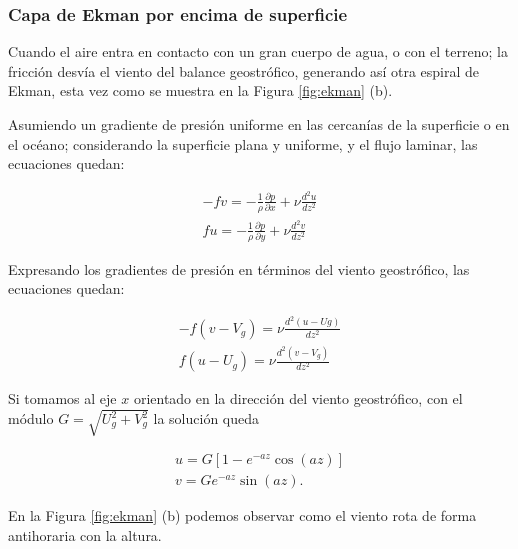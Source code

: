 \documentclass[openany]{book}
\begin{document}
\subsubsection{Capa de Ekman por encima de superficie}
Cuando el aire entra en contacto con un gran cuerpo de agua, o con el
terreno; la fricción desvía el viento del balance geostrófico,
generando así otra espiral de Ekman, esta vez como se muestra en la
Figura \ref{fig:ekman} (b).
\par Asumiendo un gradiente de presión uniforme en las cercanías de
la superficie o en el océano; considerando la superficie plana y
uniforme, y el flujo laminar, las ecuaciones quedan:

\begin{gather}
    -fv=-\frac{1}{\rho}\frac{\partial p}{\partial x}+\nu \frac{d^2u}{dz^2}\\
    fu=-\frac{1}{\rho}\frac{\partial p}{\partial y}+\nu \frac{d^2v}{dz^2}
\end{gather}

\par Expresando los gradientes de presión en términos del viento
geostrófico, las ecuaciones quedan:

\begin{gather}
    -f(v-V_{g})=\nu\frac{d^2(u-U{g})}{dz^2}\\
    f(u-U_{g})=\nu\frac{d^2(v-V_{g})}{dz^2}
\end{gather}

\par Si tomamos al eje $x$ orientado en la dirección del viento
geostrófico, con el módulo $G=\sqrt{U_{g}^2+V_{g}^2}$ la solución 
queda

\begin{gather}
    u=G[1-e^{-az}\cos{(az)}]\\
    v=Ge^{-az}\sin{(az)}.
\end{gather}

\par En la Figura \ref{fig:ekman} (b) podemos observar como el viento
rota de forma antihoraria con la altura.

\end{document}
